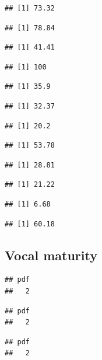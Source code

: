 \documentclass[,man,floatsintext]{apa6}
\begin{document}
\begin{verbatim}
## [1] 73.32
\end{verbatim}

\begin{verbatim}
## [1] 78.84
\end{verbatim}

\begin{verbatim}
## [1] 41.41
\end{verbatim}

\begin{verbatim}
## [1] 100
\end{verbatim}

\begin{verbatim}
## [1] 35.9
\end{verbatim}

\begin{verbatim}
## [1] 32.37
\end{verbatim}

\begin{verbatim}
## [1] 20.2
\end{verbatim}

\begin{verbatim}
## [1] 53.78
\end{verbatim}

\begin{verbatim}
## [1] 28.81
\end{verbatim}

\begin{verbatim}
## [1] 21.22
\end{verbatim}

\begin{verbatim}
## [1] 6.68
\end{verbatim}

\begin{verbatim}
## [1] 60.18
\end{verbatim}

\subsection{Vocal maturity}\label{vocal-maturity}

\begin{verbatim}
## pdf 
##   2
\end{verbatim}

\begin{verbatim}
## pdf 
##   2
\end{verbatim}

\begin{verbatim}
## pdf 
##   2
\end{verbatim}
\end{document}
